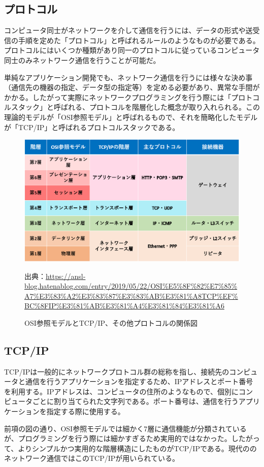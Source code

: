 \documentclass[dvipdfmx]{jsarticle}
\begin{document}
\subsection{プロトコル}
コンピュータ同士がネットワークを介して通信を行うには、データの形式や送受信の手順を定めた「プロトコル」と呼ばれるルールのようなものが必要である。プロトコルにはいくつか種類があり同一のプロトコルに従っているコンピュータ同士のみネットワーク通信を行うことが可能だ。\par
単純なアプリケーション開発でも、ネットワーク通信を行うには様々な決め事（通信先の機器の指定、データ型の指定等）を定める必要があり、異常な手間がかかる。したがって実際にネットワークプログラミングを行う際には「プロトコルスタック」と呼ばれる、プロトコルを階層化した概念が取り入れられる。この理論的モデルが「OSI参照モデル」と呼ばれるもので、それを簡略化したモデルが「TCP/IP」と呼ばれるプロトコルスタックである。
\begin{figure}[H]
  \centering
  \includegraphics[scale=0.4]{images/ositcpip.png}
  \caption{OSI参照モデルとTCP/IP、その他プロトコルの関係図}
  出典：\url{https://ansl-blog.hatenablog.com/entry/2019/05/22/OSI%E5%8F%82%E7%85%A7%E3%83%A2%E3%83%87%E3%83%AB%E3%81%A8TCP%EF%BC%8FIP%E3%81%AB%E3%81%A4%E3%81%84%E3%81%A6}
\end{figure}
\subsection{TCP/IP}
TCP/IPは一般的にネットワークプロトコル群の総称を指し、接続先のコンピュータと通信を行うアプリケーションを指定するため、IPアドレスとポート番号を利用する。IPアドレスは、コンピュータの住所のようなもので、個別にコンピュータごとに割り当てられた文字列である。ポート番号は、通信を行うアプリケーションを指定する際に使用する。\par
前項の図の通り、OSI参照モデルでは細かく7層に通信機能が分類されているが、プログラミングを行う際には細かすぎるため実用的ではなかった。したがって、よりシンプルかつ実用的な階層構造にしたものがTCP/IPである。現代ののネットワーク通信ではこのTCP/IPが用いられている。
\end{document}
